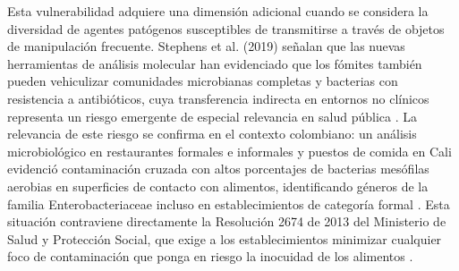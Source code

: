 Esta vulnerabilidad adquiere una dimensión adicional cuando se considera la diversidad de agentes patógenos susceptibles de transmitirse a través de objetos de manipulación frecuente. Stephens et al. (2019) señalan que las nuevas herramientas de análisis molecular han evidenciado que los fómites también pueden vehiculizar comunidades microbianas completas y bacterias con resistencia a antibióticos, cuya transferencia indirecta en entornos no clínicos representa un riesgo emergente de especial relevancia en salud pública \cite{Stephens2019}. La relevancia de este riesgo se confirma en el contexto colombiano: un análisis microbiológico en restaurantes formales e informales y puestos de comida en Cali evidenció contaminación cruzada con altos porcentajes de bacterias mesófilas aerobias en superficies de contacto con alimentos, identificando géneros de la familia Enterobacteriaceae incluso en establecimientos de categoría formal \cite{caro-hernandez_analisis_2020}. Esta situación contraviene directamente la Resolución 2674 de 2013 del Ministerio de Salud y Protección Social, que exige a los establecimientos minimizar cualquier foco de contaminación que ponga en riesgo la inocuidad de los alimentos \cite{minsalud_resolucion2674_2013}.






